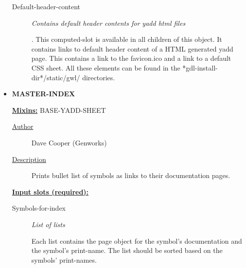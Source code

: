 \documentclass [11pt]{book}
\begin{document}
\begin{itemize}
\begin{description}
\item [Default-header-content]
\emph{Contains default header contents for yadd html files}

.
This computed-slot is available in all children of this object. It contains links
to default header content of a HTML generated yadd page. This contains a
link to the favicon.ico and a link to a default CSS sheet. All these elements can be
found in the *gdl-install-dir*/static/gwl/ directories.




\end{description}







\item {}
\textbf{MASTER-INDEX}


\textbf{
\underline{Mixins:}} BASE-YADD-SHEET





\begin{description}

\item [
\underline{Author}]


Dave Cooper (Genworks)



\item [
\underline{Description}]


Prints bullet list of symbols as links to their documentation pages.



\end{description}








\textbf{
\underline{Input slots (required):}}

\begin{description}

\item [Symbols-for-index]
\emph{List of lists}

 Each list contains the page object for the symbol's
documentation and the symbol's print-name. The list should be sorted
based on the symbols' print-names.




\end{description}







\end{itemize}
\end{document}
